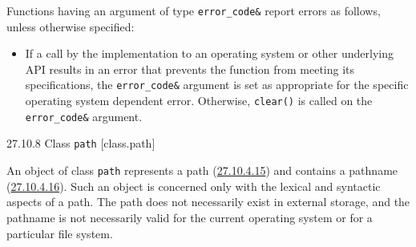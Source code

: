 Functions having an argument of type \texttt{error\_code\&} report
errors as follows, unless otherwise specified:

\begin{itemize}
\tightlist
\item
  If a call by the implementation to an operating system or other
  underlying API results in an error that prevents the function from
  meeting its specifications, the \texttt{error\_code\&} argument is set
  as appropriate for the specific operating system dependent error.
  Otherwise, \texttt{clear()} is called on the \texttt{error\_code\&}
  argument.
\end{itemize}

27.10.8 Class \texttt{path} {[}class.path{]}

An object of class \texttt{path} represents a path
(\hyperref[fs.def.path]{27.10.4.15}) and contains a pathname
(\hyperref[fs.def.pathname]{27.10.4.16}). Such an object is concerned
only with the lexical and syntactic aspects of a path. The path does not
necessarily exist in external storage, and the pathname is not
necessarily valid for the current operating system or for a particular
file system.

